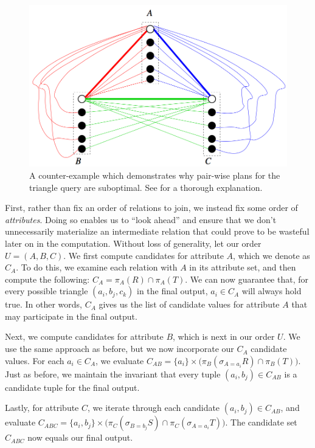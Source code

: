 \begin{figure}[h]
\label{fig:triangle}
\begin{center}
\includegraphics[scale=0.2]{triangle.png}
\end{center}
\caption{A counter-example which demonstrates why pair-wise plans for the triangle query are suboptimal. See \cite{ngo2014skew} for a thorough explanation.}
\end{figure}

First, rather than fix an order of relations to join, we instead fix some order of \emph{attributes}. Doing so enables us to ``look ahead'' and ensure that we don't unnecessarily materialize an intermediate relation that could prove to be wasteful later on in the computation. Without loss of generality, let our order $U = (A, B, C)$. We first compute candidates for attribute $A$, which we denote as $C_A$. To do this, we examine each relation with $A$ in its attribute set, and then compute the following: $C_A = \pi_A (R) \cap \pi_A (T)$. We can now guarantee that, for every possible triangle $(a_i, b_j, c_k)$ in the final output, $a_i \in C_A$ will always hold true. In other words, $C_A$ gives us the list of candidate values for attribute $A$ that may participate in the final output.

Next, we compute candidates for attribute $B$, which is next in our order $U$. We use the same approach as before, but we now incorporate our $C_A$ candidate values. For each $a_i \in C_A$, we evaluate $C_{AB} = \{a_i\} \times \big(\pi_B (\sigma_{A = a_i} R) \cap \pi_B (T)\big)$. Just as before, we maintain the invariant that every tuple $(a_i, b_j) \in C_{AB}$ is a candidate tuple for the final output.

Lastly, for attribute $C$, we iterate through each candidate $(a_i, b_j) \in C_{AB}$, and evaluate $C_{ABC} = \{a_i, b_j\} \times \big(\pi_C (\sigma_{B = b_j} S) \cap \pi_C (\sigma_{A = a_i} T)\big)$. The candidate set $C_{ABC}$ now equals our final output.

